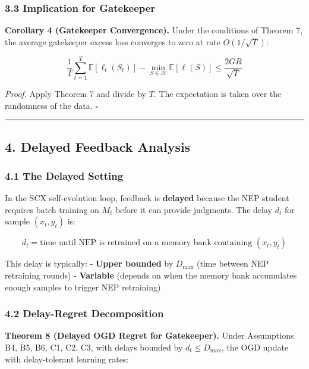 \documentclass[
  12pt,
]{article}
\begin{document}
\subsubsection{3.3 Implication for
Gatekeeper}\label{implication-for-gatekeeper}

\textbf{Corollary 4 (Gatekeeper Convergence).} Under the conditions of
Theorem 7, the average gatekeeper excess loss converges to zero at rate
\(O(1/\sqrt{T})\):

\[\frac{1}{T} \sum_{t=1}^T \mathbb{E}[\ell_t(S_t)] - \min_{S \in \mathcal{H}} \mathbb{E}[\ell(S)] \leq \frac{2GR}{\sqrt{T}}\]

\emph{Proof.} Apply Theorem 7 and divide by \(T\). The expectation is
taken over the randomness of the data. \(\square\)

\begin{center}\rule{0.5\linewidth}{0.5pt}\end{center}

\subsection{4. Delayed Feedback
Analysis}\label{delayed-feedback-analysis}

\subsubsection{4.1 The Delayed Setting}\label{the-delayed-setting}

In the SCX self-evolution loop, feedback is \textbf{delayed} because the
NEP student requires batch training on \(M_t\) before it can provide
judgments. The delay \(d_t\) for sample \((x_t, y_t)\) is:

\[d_t = \text{time until NEP is retrained on a memory bank containing } (x_t, y_t)\]

This delay is typically: - \textbf{Upper bounded} by \(D_{\max}\) (time
between NEP retraining rounds) - \textbf{Variable} (depends on when the
memory bank accumulates enough samples to trigger NEP retraining)

\subsubsection{4.2 Delay-Regret
Decomposition}\label{delay-regret-decomposition}

\textbf{Theorem 8 (Delayed OGD Regret for Gatekeeper).} Under
Assumptions B4, B5, B6, C1, C2, C3, with delays bounded by
\(d_t \leq D_{\max}\), the OGD update with delay-tolerant learning
rates:
\end{document}
